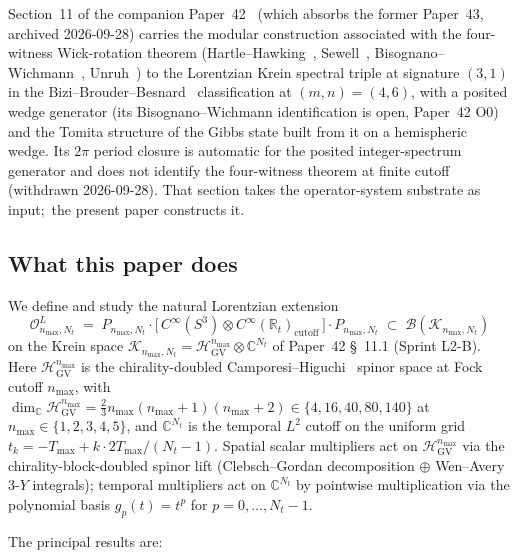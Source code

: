 \documentclass[11pt,a4paper]{article}
\theoremstyle{plain}
\theoremstyle{definition}
\newcommand{\nmax}{n_{\max}}
\newcommand{\Nt}{N_t}
\newcommand{\sthree}{S^{3}}
\newcommand{\Krein}{\mathcal{K}}
\newcommand{\Op}{\mathcal{O}}
\newcommand{\Bcal}{\mathcal{B}}
\newcommand{\R}{\mathbb{R}}
\newcommand{\C}{\mathbb{C}}
\newcommand{\HGV}{\mathcal{H}_{\mathrm{GV}}}
\begin{document}
Section~11 of the companion Paper~42~\cite{paper42} (which absorbs the
former Paper~43, archived 2026-09-28) carries
the modular construction associated with the four-witness Wick-rotation
theorem
(Hartle--Hawking~\cite{hartle_hawking1976},
Sewell~\cite{sewell1982},
Bisognano--Wichmann~\cite{bisognano_wichmann1976},
Unruh~\cite{unruh1976}) to the
Lorentzian Krein spectral triple at signature $(3, 1)$ in the
Bizi--Brouder--Besnard~\cite{bizi_brouder_besnard2018} classification
at $(m, n) = (4, 6)$, with a posited wedge generator (its
Bisognano--Wichmann identification is open, Paper~42 O0) and the
Tomita structure of the Gibbs state built from it on a hemispheric
wedge.  Its $2\pi$ period closure is
automatic for the posited integer-spectrum generator and does not
identify the four-witness theorem at finite cutoff (withdrawn
2026-09-28). That section takes the operator-system
substrate as input;\ the present paper constructs it.

\subsection{What this paper does}

We define and study the natural Lorentzian extension
\begin{equation}\label{eq:cvs_lor}
   \Op_{\nmax, \Nt}^L
   \;=\; P_{\nmax, \Nt} \cdot \bigl[\,
                C^\infty(\sthree) \otimes C^\infty(\R_t)_{\mathrm{cutoff}}
              \,\bigr]
   \cdot P_{\nmax, \Nt}
   \;\subset\; \Bcal(\Krein_{\nmax, \Nt})
\end{equation}
on the Krein space
$\Krein_{\nmax, \Nt} = \HGV^{\nmax} \otimes \C^{\Nt}$ of Paper~42
\S~11.1 (Sprint L2-B). Here $\HGV^{\nmax}$ is the
chirality-doubled Camporesi--Higuchi~\cite{camporesi_higuchi1996}
spinor space at Fock cutoff $\nmax$, with
$\dim_\C \HGV^{\nmax} = \tfrac{2}{3}\nmax(\nmax + 1)(\nmax + 2)
\in \{4, 16, 40, 80, 140\}$ at $\nmax \in \{1, 2, 3, 4, 5\}$, and
$\C^{\Nt}$ is the temporal $L^2$ cutoff on the uniform grid
$t_k = -T_{\max} + k \cdot 2T_{\max}/(\Nt - 1)$. Spatial scalar
multipliers act on $\HGV^{\nmax}$ via the chirality-block-doubled
spinor lift (Clebsch--Gordan decomposition $\oplus$ Wen--Avery
$3$-$Y$ integrals); temporal multipliers act on $\C^{\Nt}$ by
pointwise multiplication via the polynomial basis $g_p(t) = t^p$ for
$p = 0, \ldots, \Nt - 1$.

The principal results are:
\end{document}
